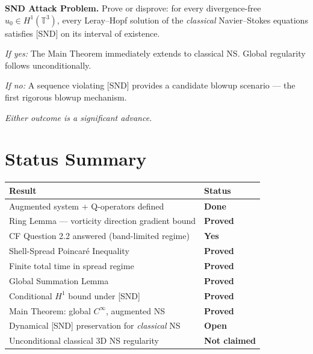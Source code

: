 \documentclass[11pt]{article}
\begin{document}
\begin{mdframed}[linecolor=open,linewidth=1.2pt,backgroundcolor=lightred]
\textbf{SND Attack Problem.}
Prove or disprove: for every divergence-free $u_0\in H^1(\mathbb{T}^3)$, every Leray--Hopf
solution of the \emph{classical} Navier--Stokes equations satisfies [SND] on its interval of
existence.

\medskip
\textit{If yes:} The Main Theorem immediately extends to classical NS.
Global regularity follows unconditionally.

\textit{If no:} A sequence violating [SND] provides a candidate blowup scenario ---
the first rigorous blowup mechanism.

\medskip
\textit{Either outcome is a significant advance.}
\end{mdframed}

\section{Status Summary}

\begin{center}
\begin{tabular}{>{\raggedright\arraybackslash}p{8cm} >{\centering\arraybackslash}p{3cm}}
\toprule
\textbf{Result} & \textbf{Status} \\
\midrule
\rowcolor{lightgreen}
Augmented system + Q-operators defined & \textcolor{proved}{\textbf{Done}} \\
\rowcolor{lightgreen}
Ring Lemma --- vorticity direction gradient bound & \textcolor{proved}{\textbf{Proved}} \\
\rowcolor{lightgreen}
CF Question 2.2 answered (band-limited regime) & \textcolor{proved}{\textbf{Yes}} \\
\rowcolor{lightgreen}
Shell-Spread Poincar\'e Inequality & \textcolor{proved}{\textbf{Proved}} \\
\rowcolor{lightgreen}
Finite total time in spread regime & \textcolor{proved}{\textbf{Proved}} \\
\rowcolor{lightgreen}
Global Summation Lemma & \textcolor{proved}{\textbf{Proved}} \\
\rowcolor{lightgreen}
Conditional $H^1$ bound under [SND] & \textcolor{proved}{\textbf{Proved}} \\
\rowcolor{lightgreen}
Main Theorem: global $C^\infty$, augmented NS & \textcolor{proved}{\textbf{Proved}} \\
\midrule
\rowcolor{lightred}
Dynamical [SND] preservation for \emph{classical} NS & \textcolor{open}{\textbf{Open}} \\
\rowcolor{lightgray}
Unconditional classical 3D NS regularity & \textcolor{notclaimed}{\textbf{Not claimed}} \\
\bottomrule
\end{tabular}
\end{center}
\end{document}
